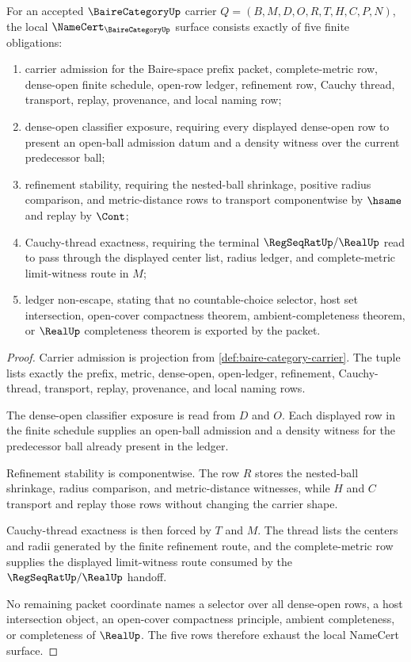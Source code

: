 \begin{theorem}
\label{thm:baire-category-namecert-obligations}
For an accepted $\BaireCategoryUp$ carrier
$Q=(B,M,D,O,R,T,H,C,P,N)$, the local
$\NameCert_{\BaireCategoryUp}$ surface consists exactly of five finite
obligations:
\begin{enumerate}
\item carrier admission for the Baire-space prefix packet, complete-metric
row, dense-open finite schedule, open-row ledger, refinement row, Cauchy
thread, transport, replay, provenance, and local naming row;
\item dense-open classifier exposure, requiring every displayed dense-open
row to present an open-ball admission datum and a density witness over the
current predecessor ball;
\item refinement stability, requiring the nested-ball shrinkage, positive
radius comparison, and metric-distance rows to transport componentwise by
$\hsame$ and replay by $\Cont$;
\item Cauchy-thread exactness, requiring the terminal $\RegSeqRatUp/\RealUp$
read to pass through the displayed center list, radius ledger, and
complete-metric limit-witness route in $M$;
\item ledger non-escape, stating that no countable-choice selector, host set
intersection, open-cover compactness theorem, ambient-completeness theorem,
or $\RealUp$ completeness theorem is exported by the packet.
\end{enumerate}
\end{theorem}
\begin{proof}
Carrier admission is projection from
\autoref{def:baire-category-carrier}. The tuple lists exactly the prefix,
metric, dense-open, open-ledger, refinement, Cauchy-thread, transport, replay,
provenance, and local naming rows.

The dense-open classifier exposure is read from $D$ and $O$. Each displayed
row in the finite schedule supplies an open-ball admission and a density
witness for the predecessor ball already present in the ledger.

Refinement stability is componentwise. The row $R$ stores the nested-ball
shrinkage, radius comparison, and metric-distance witnesses, while $H$ and $C$
transport and replay those rows without changing the carrier shape.

Cauchy-thread exactness is then forced by $T$ and $M$. The thread lists the
centers and radii generated by the finite refinement route, and the
complete-metric row supplies the displayed limit-witness route consumed by the
$\RegSeqRatUp/\RealUp$ handoff.

No remaining packet coordinate names a selector over all dense-open rows, a
host intersection object, an open-cover compactness principle, ambient
completeness, or completeness of $\RealUp$. The five rows therefore exhaust
the local NameCert surface.
\end{proof}

